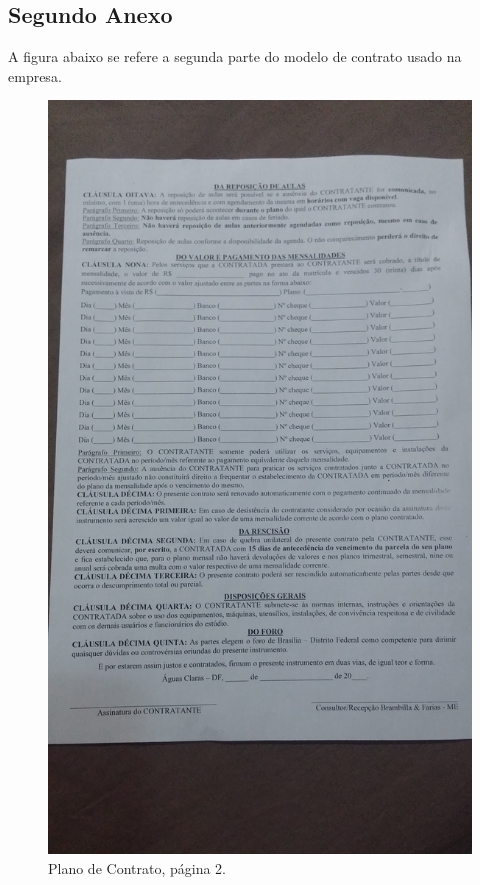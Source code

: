 \begin{anexosenv}
\chapter{Segundo Anexo}
A figura abaixo se refere a segunda parte do modelo de contrato usado na empresa.
\begin{figure}[h!]
    \centering
    \includegraphics[width=\textwidth, angle=-90]{figuras/contrato_2.jpg}
    \caption{Plano de Contrato, página 2.}
    \label{fig:contrato_2}
\end{figure}

\end{anexosenv}
